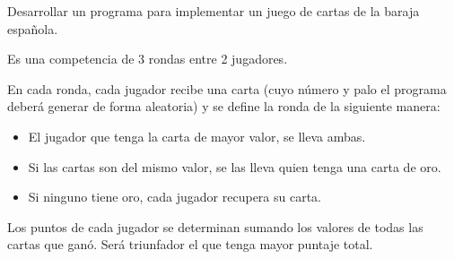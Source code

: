 Desarrollar un programa para implementar un juego de cartas de la baraja española.

Es una competencia de 3 rondas entre 2 jugadores.

En cada ronda, cada jugador recibe una carta (cuyo número y palo el programa deberá generar de forma aleatoria) y se define la ronda de la siguiente manera:

\begin{itemize}
\item El jugador que tenga la carta de mayor valor, se lleva ambas.
\item Si las cartas son del mismo valor, se las lleva quien tenga una carta de oro.
\item Si ninguno tiene oro, cada jugador recupera su carta.
\end{itemize}
Los puntos de cada jugador se determinan sumando los valores de todas las cartas que ganó. Será triunfador el que tenga mayor puntaje total.